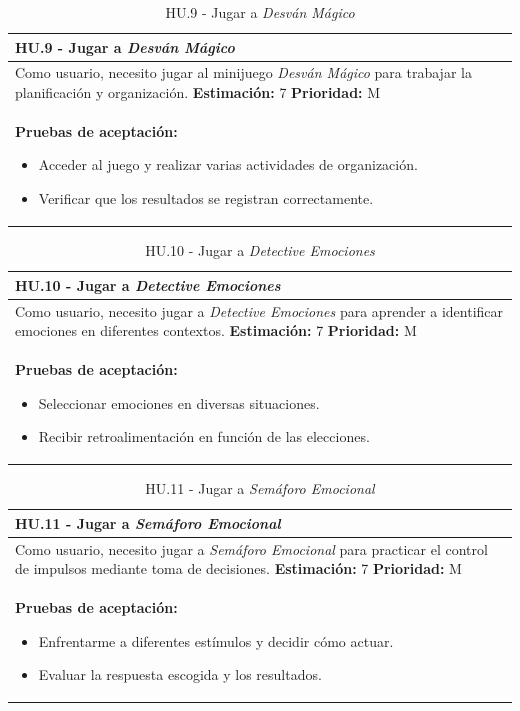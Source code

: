 \begin{table}[H]
\centering
\begin{tabularx}{\textwidth}{|X|}
\hline
\textbf{HU.9 - Jugar a \textit{Desván Mágico}}  \\
\hline
Como usuario, necesito jugar al minijuego \textit{Desván Mágico} para trabajar la planificación y organización.
\clearpage
\textbf{Estimación: }7
\clearpage
\textbf{Prioridad: }M
\\
\hline
\textbf{Pruebas de aceptación:}
\begin{itemize}
    \item Acceder al juego y realizar varias actividades de organización.
    \item Verificar que los resultados se registran correctamente.
\end{itemize}
\\
\hline
\end{tabularx}
\caption{HU.9 - Jugar a \textit{Desván Mágico}}
\end{table}

\begin{table}[H]
\centering
\begin{tabularx}{\textwidth}{|X|}
\hline
\textbf{HU.10 - Jugar a \textit{Detective Emociones}}  \\
\hline
Como usuario, necesito jugar a \textit{Detective Emociones} para aprender a identificar emociones en diferentes contextos.
\clearpage
\textbf{Estimación: }7
\clearpage
\textbf{Prioridad: }M
\\
\hline
\textbf{Pruebas de aceptación:}
\begin{itemize}
    \item Seleccionar emociones en diversas situaciones.
    \item Recibir retroalimentación en función de las elecciones.
\end{itemize}
\\
\hline
\end{tabularx}
\caption{HU.10 - Jugar a \textit{Detective Emociones}}
\end{table}

\begin{table}[H]
\centering
\begin{tabularx}{\textwidth}{|X|}
\hline
\textbf{HU.11 - Jugar a \textit{Semáforo Emocional}}  \\
\hline
Como usuario, necesito jugar a \textit{Semáforo Emocional} para practicar el control de impulsos mediante toma de decisiones.
\clearpage
\textbf{Estimación: }7
\clearpage
\textbf{Prioridad: }M
\\
\hline
\textbf{Pruebas de aceptación:}
\begin{itemize}
    \item Enfrentarme a diferentes estímulos y decidir cómo actuar.
    \item Evaluar la respuesta escogida y los resultados.
\end{itemize}
\\
\hline
\end{tabularx}
\caption{HU.11 - Jugar a \textit{Semáforo Emocional}}
\end{table}

